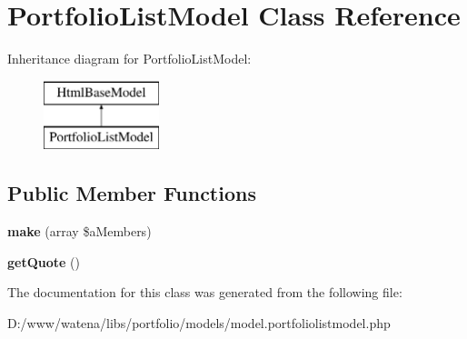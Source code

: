 \hypertarget{class_portfolio_list_model}{\section{Portfolio\-List\-Model Class Reference}
\label{class_portfolio_list_model}
}
Inheritance diagram for Portfolio\-List\-Model\-:\begin{figure}[H]
\begin{center}
\leavevmode
\includegraphics[height=2.000000cm]{class_portfolio_list_model}
\end{center}
\end{figure}
\subsection*{Public Member Functions}
\begin{DoxyCompactItemize}
\item 
\hypertarget{class_portfolio_list_model_a261de77708b98e8c0479612c2166eb96}{{\bfseries make} (array \$a\-Members)}\label{class_portfolio_list_model_a261de77708b98e8c0479612c2166eb96}

\item 
\hypertarget{class_portfolio_list_model_a3ff184c845aec4d78642d215d528294e}{{\bfseries get\-Quote} ()}\label{class_portfolio_list_model_a3ff184c845aec4d78642d215d528294e}

\end{DoxyCompactItemize}


The documentation for this class was generated from the following file\-:\begin{DoxyCompactItemize}
\item 
D\-:/www/watena/libs/portfolio/models/model.\-portfoliolistmodel.\-php\end{DoxyCompactItemize}
